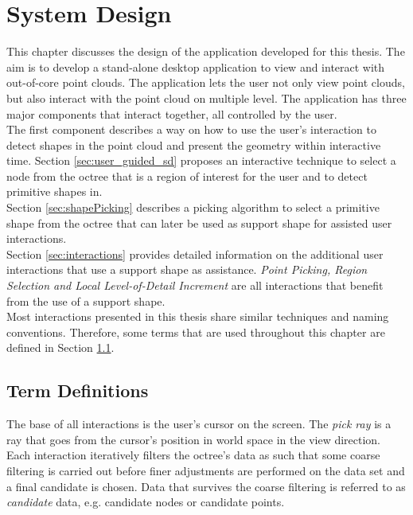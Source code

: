 \chapter{System Design}
\label{chap:systemDesign}

This chapter discusses the design of the application developed for this thesis. The aim is to develop a stand-alone desktop application to view and interact with out-of-core point clouds. The application lets the user not only view point clouds, but also interact with the point cloud on multiple level. The application has three major components that interact together, all controlled by the user. 
\\
The first component describes a way on how to use the user's interaction to detect shapes in the point cloud and present the geometry within interactive time. Section \ref{sec:user_guided_sd} proposes an interactive technique to select a node from the octree that is a region of interest for the user and to detect primitive shapes in. 
\\
Section \ref{sec:shapePicking} describes a picking algorithm to select a primitive shape from the octree that can later be used as support shape for assisted user interactions. 
\\
Section \ref{sec:interactions} provides detailed information on the additional user interactions that use a support shape as assistance. \textit{Point Picking, Region Selection and Local Level-of-Detail Increment} are all interactions that benefit from the use of a support shape. 
\\
Most interactions presented in this thesis share similar techniques and naming conventions. Therefore, some terms that are used throughout this chapter are defined in Section \ref{sec:termDefinitions}. 


\section{Term Definitions}
\label{sec:termDefinitions}

The base of all interactions is the user's cursor on the screen. The \textit{pick ray} is a ray that goes from the cursor’s position in world space in the view direction. 
Each interaction iteratively filters the octree's data as such that some coarse filtering is carried out before finer adjustments are performed on the data set and a final candidate is chosen. Data that survives the coarse filtering is referred to as \textit{candidate} data, e.g. candidate nodes or candidate points. 


